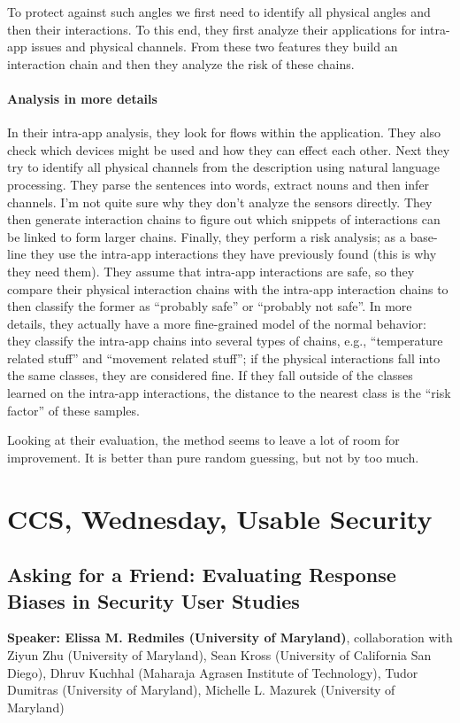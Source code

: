 \documentclass{article}
\begin{document}
To protect against such angles we first need to identify all physical angles and then their interactions. To this end, they first analyze their applications for intra-app issues and physical channels. From these two features they build an interaction chain and then they analyze the risk of these chains. 

\paragraph{Analysis in more details}
In their intra-app analysis, they look for flows within the application. They also check which devices might be used and how they can effect each other.  Next they try to identify all physical channels from the description using natural language processing. They parse the sentences into words, extract nouns and then infer channels. I'm not quite sure why they don't analyze the sensors directly.
%
They then generate interaction chains to figure out which snippets of interactions can be linked to form larger chains.
 Finally, they perform a risk analysis; as a base-line they use the intra-app interactions they have previously found (this is why they need them). They assume that intra-app interactions are safe, so they compare their physical interaction chains with the intra-app interaction chains to then classify the former as ``probably safe'' or ``probably not safe''.
%
In more details, they actually have a more fine-grained model of the normal behavior: they classify the intra-app chains into several types of chains, e.g., ``temperature related stuff'' and ``movement related stuff''; if the physical interactions fall into the same classes, they are considered fine. If they fall outside of the classes learned on the intra-app interactions, the distance to the nearest class is the ``risk factor'' of these samples.

Looking at their evaluation, the method seems to leave a lot of room for improvement. It is better than pure random guessing, but not by too much.


\section{CCS, Wednesday, Usable Security}
\subsection{Asking for a Friend: Evaluating Response Biases in Security User Studies}
\noindent\textbf{Speaker: Elissa M. Redmiles (University of Maryland)}, collaboration with Ziyun Zhu (University of Maryland), Sean Kross (University of California San Diego), Dhruv Kuchhal (Maharaja Agrasen Institute of Technology), Tudor Dumitras (University of Maryland), Michelle L. Mazurek (University of Maryland)
\end{document}
